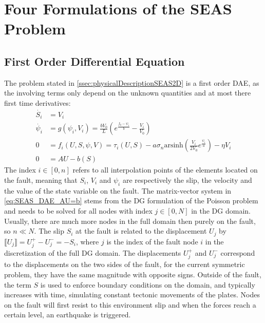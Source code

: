 \chapter{Four Formulations of the SEAS Problem}

\section{First Order Differential Equation}
The problem stated in \autoref{ssec:physicalDescriptionSEAS2D} is a first order DAE, as the involving terms only depend on the unknown quantities and at most there first time derivatives:
\begin{align}
    \dot{S_i} &= V_i \label{eq:SEASDAE_dV_dt} \\
	\dot{\psi_i} &= g(\psi_i, V_i) =\frac{bV_0}{L}\left(e^{\frac{f_0-\psi_i}{b}} - \frac{V_i}{V_0}\right) \label{eq:SEAS_DAE_ageing_law} \\
	0 &= f_i(U,S,\psi,V) = \tau_i(U,S) - a\sigma_n\text{arsinh}\left(\frac{V_i}{2V_0}e^{\frac{\psi_i}{a}}\right) -\eta V_i \label{eq:SEASDAE_frictionLaw}\\
    0 &= AU - b(S) \label{eq:SEAS_DAE_AU=b}  
\end{align}
The index $i\in[0,n]$ refers to all interpolation points of the elements located on the fault, meaning that $S_i$, $V_i$ and $\psi_i$ are respectively the slip, the velocity and the value of the state variable on the fault. The matrix-vector system in \autoref{eq:SEAS_DAE_AU=b} stems from the DG formulation of the Poisson problem and needs to be solved for all nodes with index $j\in[0,N]$ in the DG domain. Usually, there are much more nodes in the full domain then purely on the fault, so $n \ll N$. The slip $S_i$ at the fault is related to the displacement $U_j$ by $\llbracket U_j \rrbracket = U_j^+ - U_j^- = -S_i$, where $j$ is the index of the fault node $i$ in the discretization of the full DG domain. The displacements $U_j^+$ and $U_j^-$ correspond to the displacements on the two sides of the fault, for the current symmetric problem, they have the same magnitude with opposite signs. Outside of the fault, the term $S$ is used to enforce boundary conditions on the domain, and typically increases with time, simulating constant tectonic movements of the plates. Nodes on the fault will first resist to this environment slip and when the forces reach a certain level, an earthquake is triggered. \\
